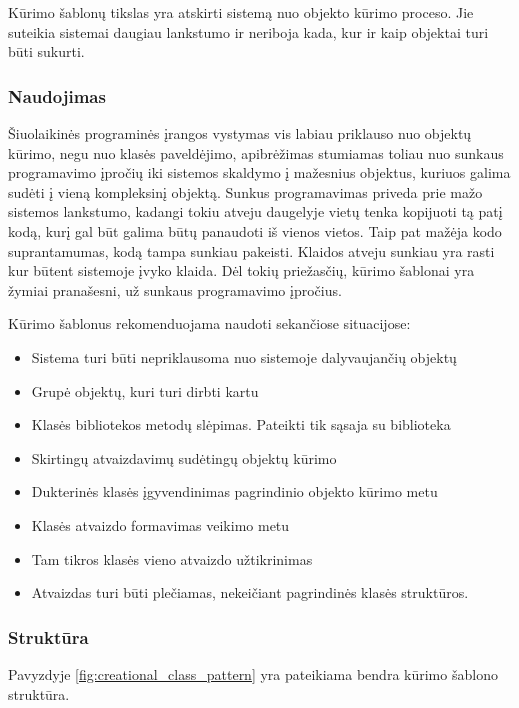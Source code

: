 \documentclass[10pt]{IEEEtran}
\begin{document}
				Kūrimo šablonų tikslas yra atskirti sistemą nuo objekto kūrimo proceso. Jie suteikia sistemai daugiau lankstumo ir neriboja kada, kur ir kaip objektai turi būti sukurti.

			\subsubsection{Naudojimas}

				Šiuolaikinės programinės įrangos vystymas vis labiau priklauso nuo objektų kūrimo, negu nuo klasės paveldėjimo, apibrėžimas stumiamas toliau nuo sunkaus programavimo įpročių iki sistemos skaldymo į mažesnius objektus, kuriuos galima sudėti į vieną kompleksinį objektą. Sunkus programavimas priveda prie mažo sistemos lankstumo, kadangi tokiu atveju daugelyje vietų tenka kopijuoti tą patį kodą, kurį gal būt galima būtų panaudoti iš vienos vietos. Taip pat mažėja kodo suprantamumas, kodą tampa sunkiau pakeisti. Klaidos atveju sunkiau yra rasti kur būtent sistemoje įvyko klaida. Dėl tokių priežasčių, kūrimo šablonai yra žymiai pranašesni, už sunkaus programavimo įpročius.

				Kūrimo šablonus rekomenduojama naudoti sekančiose situacijose:

				\begin{itemize}
					\item Sistema turi būti nepriklausoma nuo sistemoje dalyvaujančių objektų
					\item Grupė objektų, kuri turi dirbti kartu
					\item Klasės bibliotekos metodų slėpimas. Pateikti tik sąsaja su biblioteka
					\item Skirtingų atvaizdavimų sudėtingų objektų kūrimo
					\item Dukterinės klasės įgyvendinimas pagrindinio objekto kūrimo metu
					\item Klasės atvaizdo formavimas veikimo metu
					\item Tam tikros klasės vieno atvaizdo užtikrinimas
					\item Atvaizdas turi būti plečiamas, nekeičiant pagrindinės klasės struktūros.
				\end{itemize} 

			\subsubsection{Struktūra}

				Pavyzdyje \ref{fig:creational_class_pattern} yra pateikiama bendra kūrimo šablono struktūra.
\end{document}

